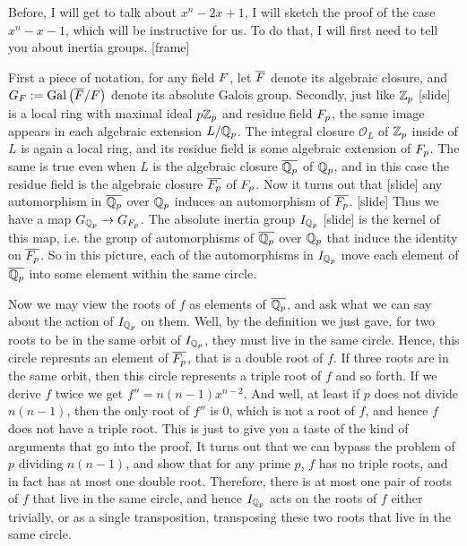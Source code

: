 \documentclass[../../main.tex]{subfiles}
\begin{document}
Before, I will get to talk about $x^n -2x + 1$, I will sketch the proof of the case $x^n - x - 1$, which will be instructive for us.
To do that, I will first need to tell you about inertia groups.
[frame]

First a piece of notation, for any field $F$, let $\overline{F}$ denote its algebraic closure, and $G_F := \operatorname{Gal}\left( \overline{F}/F \right)$ denote its absolute Galois group.
Secondly, just like $\mathbb{Z}_p$ [slide] is a local ring with maximal ideal $p\mathbb{Z}_p$ and residue field $F_p$, the same image appears in each algebraic extension $L/\mathbb{Q}_p$.
The integral closure $\mathcal{O}_L$ of $\mathbb{Z}_p$ inside of $L$ is again a local ring, and its residue field is some algebraic extension of $F_p$.
The same is true even when $L$ is the algebraic closure $\overline{\mathbb{Q}_p}$ of $\mathbb{Q}_p$, and in this case the residue field is the algebraic closure $\overline{F_p}$ of $F_p$.
Now it turns out that [slide] any automorphism in $\overline{\mathbb{Q}_p}$ over $\mathbb{Q}_p$ induces an automorphism of $\overline{F_p}$.
[slide]
Thus we have a map $G_{\mathbb{Q}_p} \to G_{F_p}$.
The absolute inertia group $I_{\mathbb{Q}_p}$ [slide] is the kernel of this map, i.e. the group of automorphisms of $\overline{\mathbb{Q}_p}$ over $\mathbb{Q}_p$ that induce the identity on $\overline{F_p}$.
So in this picture, each of the automorphisms in $I_{\mathbb{Q}_p}$ move each element of $\overline{\mathbb{Q}_p}$ into some element within the same circle.

Now we may view the roots of $f$ as elements of $\overline{\mathbb{Q}_p}$, and ask what we can say about the action of $I_{\mathbb{Q}_p}$ on them.
Well, by the definition we just gave, for two roots to be in the same orbit of $I_{\mathbb{Q}_p}$, they must live in the same circle.
Hence, this circle represnts an element of $\overline{F_p}$, that is a double root of $f$.
If three roots are in the same orbit, then this circle represents a triple root of $f$ and so forth. 
If we derive $f$ twice we get $f'' = n\left( n-1 \right) x^{n-2}$.
And well, at least if $p$ does not divide $n\left( n-1 \right)$, then the only root of $f''$ is $0$, which is not a root of $f$, and hence $f$ does not have a triple root.
This is just to give you a taste of the kind of arguments that go into the proof.
It turns out that we can bypass the problem of $p$ dividing $n\left( n-1 \right)$, and show that for any prime $p$, $f$ has no triple roots, and in fact has at most one double root.
Therefore, there is at most one pair of roots of $f$ that live in the same circle, and hence $I_{\mathbb{Q}_p}$ acts on the roots of $f$ either trivially, or as a single transposition, transposing these two roots that live in the same circle.
\end{document}
